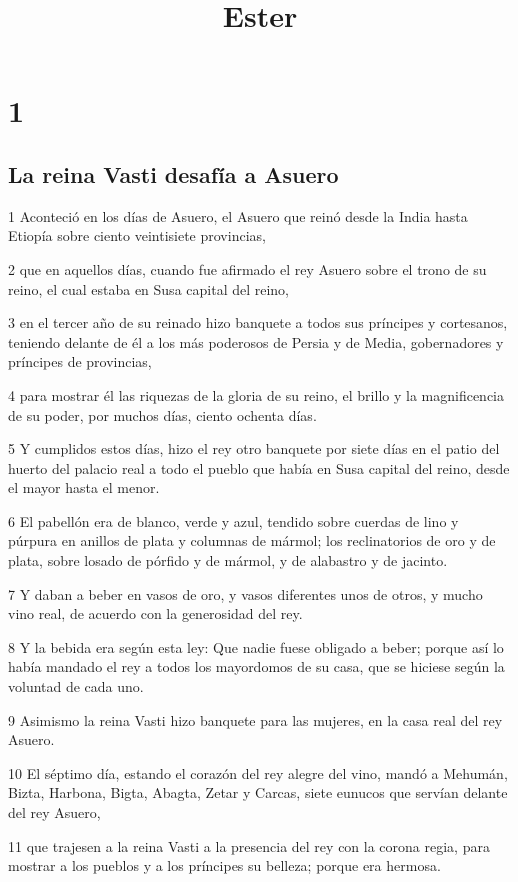 

\title{Ester}

\chapter{1}

\section*{La reina Vasti desafía a Asuero}

\par 1 Aconteció en los días de Asuero, el Asuero que reinó desde la India hasta Etiopía sobre ciento veintisiete provincias,
\par 2 que en aquellos días, cuando fue afirmado el rey Asuero sobre el trono de su reino, el cual estaba en Susa capital del reino,
\par 3 en el tercer año de su reinado hizo banquete a todos sus príncipes y cortesanos, teniendo delante de él a los más poderosos de Persia y de Media, gobernadores y príncipes de provincias,
\par 4 para mostrar él las riquezas de la gloria de su reino, el brillo y la magnificencia de su poder, por muchos días, ciento ochenta días.
\par 5 Y cumplidos estos días, hizo el rey otro banquete por siete días en el patio del huerto del palacio real a todo el pueblo que había en Susa capital del reino, desde el mayor hasta el menor.
\par 6 El pabellón era de blanco, verde y azul, tendido sobre cuerdas de lino y púrpura en anillos de plata y columnas de mármol; los reclinatorios de oro y de plata, sobre losado de pórfido y de mármol, y de alabastro y de jacinto.
\par 7 Y daban a beber en vasos de oro, y vasos diferentes unos de otros, y mucho vino real, de acuerdo con la generosidad del rey.
\par 8 Y la bebida era según esta ley: Que nadie fuese obligado a beber; porque así lo había mandado el rey a todos los mayordomos de su casa, que se hiciese según la voluntad de cada uno.
\par 9 Asimismo la reina Vasti hizo banquete para las mujeres, en la casa real del rey Asuero.
\par 10 El séptimo día, estando el corazón del rey alegre del vino, mandó a Mehumán, Bizta, Harbona, Bigta, Abagta, Zetar y Carcas, siete eunucos que servían delante del rey Asuero,
\par 11 que trajesen a la reina Vasti a la presencia del rey con la corona regia, para mostrar a los pueblos y a los príncipes su belleza; porque era hermosa.
